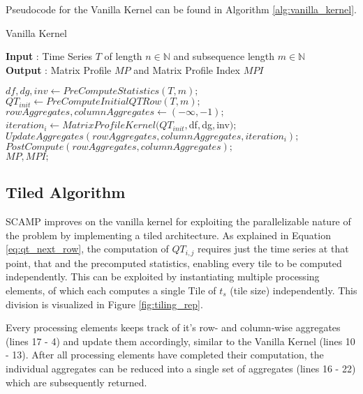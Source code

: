 Pseudocode for the Vanilla Kernel can be found in Algorithm \ref{alg:vanilla_kernel}.

\begin{algorithm}
\caption{Vanilla Kernel}\label{alg:vanilla_kernel}
    \hspace*{\algorithmicindent} \textbf{Input} : Time Series $T$ of length \( n \in \mathbb{N} \) and subsequence length  \( m \in \mathbb{N} \) \\
    \hspace*{\algorithmicindent} \textbf{Output} : Matrix Profile $MP$ and Matrix Profile Index $MPI$
    \begin{algorithmic}[1]
        \State $df,dg,inv \gets PreComputeStatistics(T, m);$
        \State $QT_{init} \gets PreComputeInitialQTRow(T, m);$
        \State $rowAggregates, columnAggregates \gets (-\infty, -1);$
            \State $iteration_i \gets MatrixProfileKernel(QT_{init}, $df$, $dg$, $inv$);$
            \State $UpdateAggregates(rowAggregates, columnAggregates, iteration_i);$
        \EndFor
        \State $PostCompute(rowAggregates, columnAggregates);$\\
        \Return $MP, MPI;$
    \end{algorithmic}
\end{algorithm}
    
\subsection{Tiled Algorithm} \label{subsection:tiled_kernel}

SCAMP improves on the vanilla kernel for exploiting the parallelizable nature of the problem by implementing a tiled architecture.
As explained in Equation \ref{eq:qt_next_row}, the computation of $QT_{i,j}$ requires just the time series at that point, that and the precomputed statistics, enabling every tile to be computed independently.
This can be exploited by instantiating multiple processing elements, of which each computes a single Tile of $t_s$ (tile size) independently. This division is visualized in Figure \ref{fig:tiling_rep}.

Every processing elements keeps track of it's row- and column-wise aggregates (lines 17 - 4) and update them accordingly,
similar to the Vanilla Kernel (lines 10 - 13). After all processing elements have completed their computation,
the individual aggregates can be reduced into a single set of aggregates (lines 16 - 22) which are subsequently returned.

